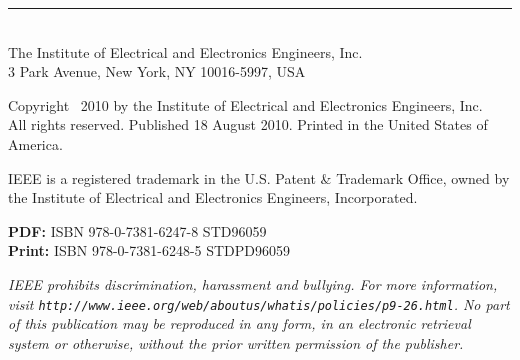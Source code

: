 \vfill
{\fontsize{7.0}{8.35}\selectfont
\rule{1.45in}{0.4pt}\\[6pt]
The Institute of Electrical and Electronics Engineers, Inc.\\
3 Park Avenue, New York, NY 10016-5997, USA

Copyright \textcopyright\ 2010 by the Institute of Electrical and Electronics Engineers, Inc.\\
All rights reserved. Published 18 August 2010. Printed in the United States of America.

IEEE is a registered trademark in the U.S. Patent \& Trademark Office, owned by the Institute of Electrical and Electronics Engineers, Incorporated.

\textbf{PDF:}\hspace{1.15em} ISBN 978-0-7381-6247-8\hspace{1.3em} STD96059\\
\textbf{Print:}\hspace{0.75em} ISBN 978-0-7381-6248-5\hspace{1.3em} STDPD96059

\textit{IEEE prohibits discrimination, harassment and bullying. For more information, visit \nolinkurl{http://www.ieee.org/web/aboutus/whatis/policies/p9-26.html}. No part of this publication may be reproduced in any form, in an electronic retrieval system or otherwise, without the prior written permission of the publisher.}
}
\endgroup
\clearpage
